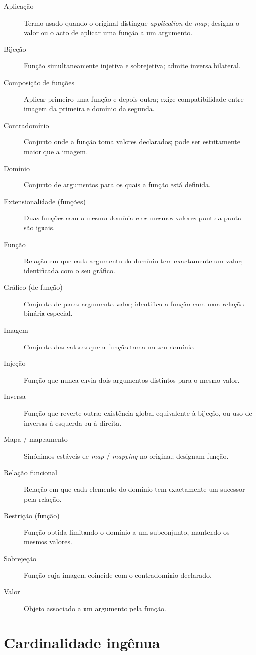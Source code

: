 \begin{description}
\item[Aplicação] Termo usado quando o original distingue \textit{application} de \textit{map}; designa o valor ou o acto de aplicar uma função a um argumento.
\item[Bijeção] Função simultaneamente injetiva e sobrejetiva; admite inversa bilateral.
\item[Composição de funções] Aplicar primeiro uma função e depois outra; exige compatibilidade entre imagem da primeira e domínio da segunda.
\item[Contradomínio] Conjunto onde a função toma valores declarados; pode ser estritamente maior que a imagem.
\item[Domínio] Conjunto de argumentos para os quais a função está definida.
\item[Extensionalidade (funções)] Duas funções com o mesmo domínio e os mesmos valores ponto a ponto são iguais.
\item[Função] Relação em que cada argumento do domínio tem exactamente um valor; identificada com o seu gráfico.
\item[Gráfico (de função)] Conjunto de pares argumento-valor; identifica a função com uma relação binária especial.
\item[Imagem] Conjunto dos valores que a função toma no seu domínio.
\item[Injeção] Função que nunca envia dois argumentos distintos para o mesmo valor.
\item[Inversa] Função que reverte outra; existência global equivalente à bijeção, ou uso de inversas à esquerda ou à direita.
\item[Mapa / mapeamento] Sinónimos estáveis de \textit{map} / \textit{mapping} no original; designam função.
\item[Relação funcional] Relação em que cada elemento do domínio tem exactamente um sucessor pela relação.
\item[Restrição (função)] Função obtida limitando o domínio a um subconjunto, mantendo os mesmos valores.
\item[Sobrejeção] Função cuja imagem coincide com o contradomínio declarado.
\item[Valor] Objeto associado a um argumento pela função.
\end{description}

\section*{Cardinalidade ingênua}

